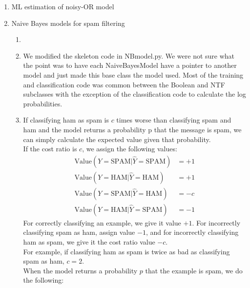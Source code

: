 \documentclass{article}
\begin{document}
\begin{enumerate}
    \item ML estimation of noisy-OR model %
    
    \item Naive Bayes models for spam filtering %
        \begin{enumerate}
            \item %
            \item %
                We modified the skeleton code in NBmodel.py. We were not
                sure what the point was to have each NaiveBayesModel have
                a pointer to another model and just made this base class the
                model used. Most of the training and classification code was
                common between the Boolean and NTF subclasses with the
                exception of the classification code to calculate the log
                probabilities. \\
            \item %
                If classifying ham as spam is \(c\) times worse than 
                classifying spam and ham and the model returns a
                probability p that the message is spam, we can simply
                calculate the expected value given that probability. \\
                If the cost ratio is \(c\), we assign the following values:
                \begin{align*}
                    \text{Value}(Y=\text{SPAM}|\hat{Y}=\text{SPAM}) &= +1 \\
                    \text{Value}(Y=\text{HAM}|\hat{Y}=\text{HAM}) &= +1 \\
                    \text{Value}(Y=\text{SPAM}|\hat{Y}=\text{HAM}) &= -c \\
                    \text{Value}(Y=\text{HAM}|\hat{Y}=\text{SPAM}) &= -1
                \end{align*}
                For correctly classifying an example, we give it value 
                \(+1\). For incorrectly classifying spam as ham, assign
                value \(-1\), and for incorrectly classifying ham as spam,
                we give it the cost ratio value \(-c\). \\
                For example, if classifying ham as spam is twice as bad
                as classifying spam as ham, \(c=2\). \\
                When the model returns a probability \(p\) that the example
                is spam, we do the following:
                \begin{itemize}

\end{itemize}
\end{enumerate}
\end{enumerate}
\end{document}
